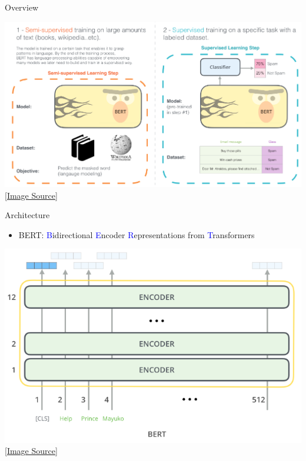 \begin{frame}[fragile]{Overview}

    \begin{center}
        \includegraphics[scale=0.3]{../images/img_8.png} \\
        \href{http://jalammar.github.io/illustrated-bert/}{[Image Source]}
    \end{center}

\end{frame}

\begin{frame}[fragile]{Architecture}

    \begin{itemize}
        \item BERT: \textcolor{blue}{B}idirectional \textcolor{blue}{E}ncoder \textcolor{blue}{R}epresentations from \textcolor{blue}{T}ransformers \cite{devlin2018bert}
    \end{itemize}

    \begin{center}
        \includegraphics[scale=0.3]{../images/img_9.png} \\
        \href{http://jalammar.github.io/illustrated-bert/}{[Image Source]}
    \end{center}

\end{frame}
